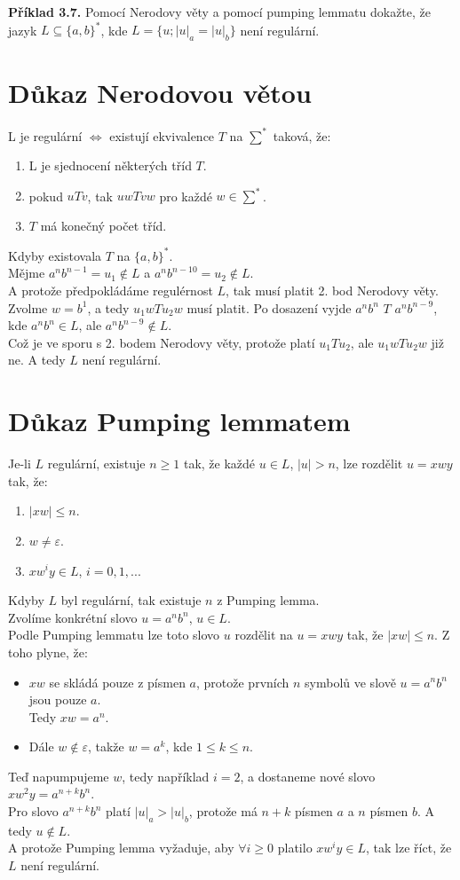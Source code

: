 \documentclass[11pt]{article}
\begin{document}
\pagebreak 

\textbf{Příklad 3.7.} Pomocí Nerodovy věty a pomocí pumping lemmatu dokažte, že jazyk $L \subseteq \{a, b\}^*$, kde $L=\{u; |u|_a = |u|_b\}$ není regulární.

\section{Důkaz Nerodovou větou} 
L je regulární $\iff$ existují ekvivalence $T$ na $\sum^*$ taková, že:
\begin{enumerate}
    \item L je sjednocení některých tříd $T$.
    \item pokud $uTv$, tak $uwTvw$ pro každé $w \in \sum^*$.
    \item $T$ má konečný počet tříd.
\end{enumerate}
Kdyby existovala $T$ na $\{a, b\}^*.$\\
Mějme $a^n b^{n-1} = u_1 \not\in L$ a $a^n b^{n-10}= u_2 \not\in L$.\\
A protože předpokládáme regulérnost $L$, tak musí platit 2. bod Nerodovy věty.\\
Zvolme $w=b^1$, a tedy $u_1 w T u_2 w$ musí platit. Po dosazení vyjde $a^n b^n$ $T$ $a^n b^{n-9}$, kde $a^n b^n \in L$, ale $a^n b^{n-9} \not\in L$.\\
Což je ve sporu s 2. bodem Nerodovy věty, protože platí $u_1Tu_2$, ale $u_1 w T u_2 w$ již ne. A tedy $L$ není regulární.


\section{Důkaz Pumping lemmatem}
Je-li $L$ regulární, existuje $n \geq 1$ tak, že každé $u \in L$, $|u|>n$, lze rozdělit $u=xwy$ tak, že:
\begin{enumerate}
    \item $|xw| \leq n$.
    \item $w \neq \varepsilon$.
    \item $xw^iy \in L$, $i=0, 1, ...$
\end{enumerate}
Kdyby $L$ byl regulární, tak existuje $n$ z Pumping lemma.\\
Zvolíme konkrétní slovo $u = a^n b^n$, $u \in L$.\\
Podle Pumping lemmatu lze toto slovo $u$ rozdělit na $u=xwy$ tak, že $|xw| \leq n$. Z toho plyne, že:
    \begin{itemize}
        \item $xw$ se skládá pouze z písmen $a$, protože prvních $n$ symbolů ve slově $u=a^n b^n$ jsou pouze $a$.\\
        Tedy $xw = a^n$.
        \item Dále $w \not\in \varepsilon$, takže $w=a^k$, kde $1 \leq k \leq n$.
    \end{itemize}
Teď napumpujeme $w$, tedy například $i=2$, a dostaneme nové slovo $xw^2y = a^{n+k} b^n$.\\
Pro slovo $a^{n+k} b^n$ platí $|u|_a > |u|_b$, protože má $n+k$ písmen $a$ a $n$ písmen $b$. A tedy $u \not\in L$. \\
A protože Pumping lemma vyžaduje, aby  $\forall i \geq 0$ platilo $xw^iy \in L$, tak lze říct, že $L$ není regulární.


 
\end{document}
